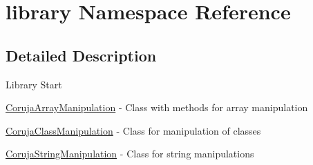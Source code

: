 \hypertarget{namespacelibrary}{
\section{library Namespace Reference}
\label{namespacelibrary}
}


\subsection{Detailed Description}
Library Start

\hyperlink{class_coruja_array_manipulation}{CorujaArrayManipulation} - Class with methods for array manipulation

\hyperlink{class_coruja_class_manipulation}{CorujaClassManipulation} - Class for manipulation of classes

\hyperlink{class_coruja_string_manipulation}{CorujaStringManipulation} - Class for string manipulations 


